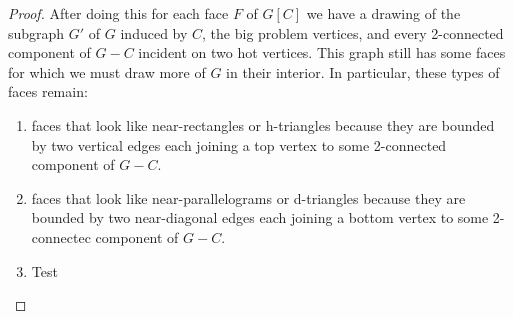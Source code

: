 \documentclass{patmorin}
\begin{document}
\begin{proof}
  After doing this for each face $F$ of $G[C]$ we have a drawing of the
  subgraph $G'$ of $G$ induced by $C$, the big problem vertices, and every
  2-connected component of $G-C$ incident on two hot vertices.  This graph
  still has some faces for which we must draw more of $G$ in their interior.
  In particular, these types of faces remain:
  \begin{enumerate}
     \item faces that look like near-rectangles or h-triangles because they are bounded by two vertical edges each joining a top vertex to some 2-connected component of $G-C$.
     \item faces that look like near-parallelograms or d-triangles because they are bounded by two near-diagonal edges each joining a bottom vertex to some 2-connectec component of $G-C$.
     \item Test  
  \end{enumerate}

\end{proof}
\end{document}

